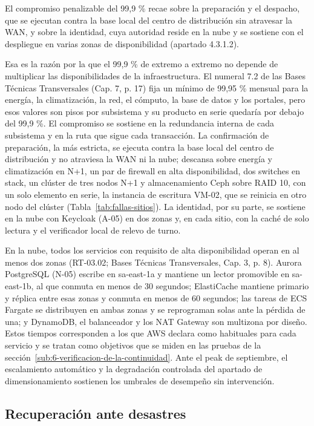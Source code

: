 El compromiso penalizable del 99,9 \% recae sobre la preparación y el despacho, que se ejecutan contra la base local del centro de distribución sin atravesar la WAN, y sobre la identidad, cuya autoridad reside en la nube y se sostiene con el despliegue en varias zonas de disponibilidad (apartado 4.3.1.2).

Esa es la razón por la que el 99,9 \% de extremo a extremo no depende de multiplicar las disponibilidades de la infraestructura. El numeral 7.2 de las Bases Técnicas Transversales (Cap. 7, p. 17) fija un mínimo de 99,95 \% mensual para la energía, la climatización, la red, el cómputo, la base de datos y los portales, pero esos valores son pisos por subsistema y su producto en serie quedaría por debajo del 99,9 \%. El compromiso se sostiene en la redundancia interna de cada subsistema y en la ruta que sigue cada transacción. La confirmación de preparación, la más estricta, se ejecuta contra la base local del centro de distribución y no atraviesa la WAN ni la nube; descansa sobre energía y climatización en N+1, un par de firewall en alta disponibilidad, dos switches en stack, un clúster de tres nodos N+1 y almacenamiento Ceph sobre RAID 10, con un solo elemento en serie, la instancia de escritura VM-02, que se reinicia en otro nodo del clúster (Tabla~\ref{tab:fallas-sitios}). La identidad, por su parte, se sostiene en la nube con Keycloak (A-05) en dos zonas y, en cada sitio, con la caché de solo lectura y el verificador local de relevo de turno.

En la nube, todos los servicios con requisito de alta disponibilidad operan en al menos dos zonas (RT-03.02; Bases Técnicas Transversales, Cap. 3, p. 8). Aurora PostgreSQL (N-05) escribe en sa-east-1a y mantiene un lector promovible en sa-east-1b, al que conmuta en menos de 30 segundos; ElastiCache mantiene primario y réplica entre esas zonas y conmuta en menos de 60 segundos; las tareas de ECS Fargate se distribuyen en ambas zonas y se reprograman solas ante la pérdida de una; y DynamoDB, el balanceador y los NAT Gateway son multizona por diseño. Estos tiempos corresponden a los que AWS declara como habituales para cada servicio y se tratan como objetivos que se miden en las pruebas de la sección~\ref{sub:6-verificacion-de-la-continuidad}. Ante el peak de septiembre, el escalamiento automático y la degradación controlada del apartado de dimensionamiento sostienen los umbrales de desempeño sin intervención.

\subsection{Recuperación ante desastres}
\label{sub:4-recuperacion-ante-desastres-ba-art-20-rt}

